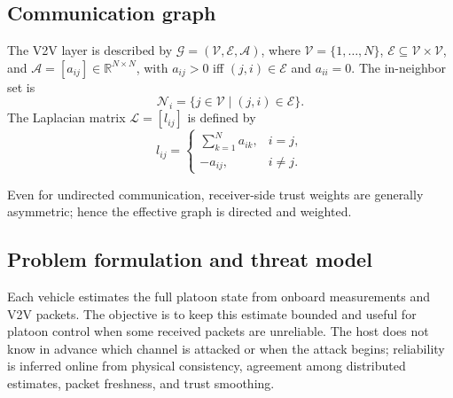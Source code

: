 \documentclass[letterpaper,journal]{IEEEtran}
\def\V{\mathcal{V}} %
\def\E{\mathcal{E}} %
\def\G{\mathcal{G}} %
\def\A{\mathcal{A}} %
\def\L{\mathcal{L}} %
\def\N{\mathcal{N}} %
\begin{document}

\subsection{Communication graph}
The V2V layer is described by $\G=(\V,\E,\A)$, where $\V=\{1,\ldots,N\}$, $\E\subseteq\V\times\V$, and $\A=[a_{ij}]\in\mathbb{R}^{N\times N}$, with $a_{ij}>0$ iff $(j,i)\in\E$ and $a_{ii}=0$. The in-neighbor set is
\begin{equation}
    \N_i=\{j\in\V\mid (j,i)\in\E\}.
\end{equation}
The Laplacian matrix $\L=[l_{ij}]$ is defined by
\begin{equation}
    l_{ij}=\begin{cases}
        \sum_{k=1}^{N}a_{ik}, & i=j,\\
        -a_{ij}, & i\neq j.
    \end{cases}
\end{equation}

Even for undirected communication, receiver-side trust weights are generally asymmetric; hence the effective graph is directed and weighted.

\subsection{Problem formulation and threat model}\label{subsec_threat_model}

Each vehicle estimates the full platoon state from onboard measurements and V2V packets. The objective is to keep this estimate bounded and useful for platoon control when some received packets are unreliable. The host does not know in advance which channel is attacked or when the attack begins; reliability is inferred online from physical consistency, agreement among distributed estimates, packet freshness, and trust smoothing.
\end{document}
